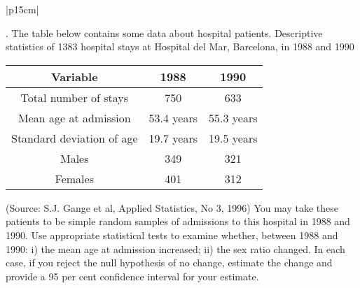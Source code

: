 \documentclass[a4paper,12pt]{article}
\begin{document}
\begin{table}[ht!]
     
\centering
     
\begin{tabular}{|p{15cm}|}
     
. The table below contains some data about hospital patients.
Descriptive statistics of 1383 hospital stays at Hospital del Mar, Barcelona,
in 1988 and 1990
\begin{center}
\begin{tabular}{|c|c|c|}
Variable 	&	1988	&	1990	\\ \hline
Total number of stays 	&	750	&	633	\\ \hline
Mean age at admission	&	53.4 years	&	55.3 years	\\ \hline
Standard deviation of age	&	19.7 years	&	19.5 years	\\ \hline
Males	&	349	&	321	\\ \hline
Females	&	401	&	312	\\ \hline
\end{tabular}
\end{center}

(Source: S.J. Gange et al, Applied Statistics, No 3, 1996)
You may take these patients to be simple random samples of admissions to this hospital in
1988 and 1990. Use appropriate statistical tests to examine whether, between 1988 and
1990:
i) the mean age at admission increased;
ii) the sex ratio changed.
In each case, if you reject the null hypothesis of no change, estimate the change and provide
a 95 per cent confidence interval for your estimate.
\\ \hline
      
\end{tabular}
    
\end{table}
\end{document}

